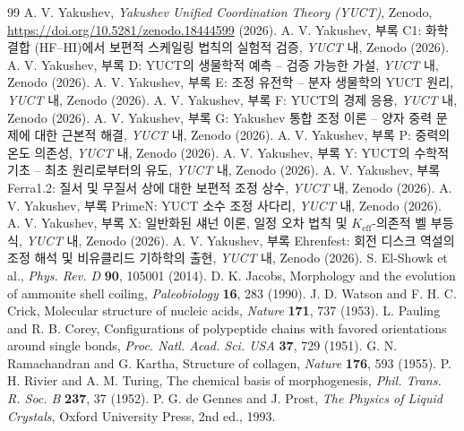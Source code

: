 \documentclass[11pt,a4paper]{article}
\begin{document}
	\begin{thebibliography}{99}
		A. V. Yakushev, \emph{Yakushev Unified Coordination Theory (YUCT)}, Zenodo, \url{https://doi.org/10.5281/zenodo.18444599} (2026).
		A. V. Yakushev, 부록 C1: 화학 결합 (HF–HI)에서 보편적 스케일링 법칙의 실험적 검증, \emph{YUCT} 내, Zenodo (2026).
		A. V. Yakushev, 부록 D: YUCT의 생물학적 예측 – 검증 가능한 가설, \emph{YUCT} 내, Zenodo (2026).
		A. V. Yakushev, 부록 E: 조정 유전학 – 분자 생물학의 YUCT 원리, \emph{YUCT} 내, Zenodo (2026).
		A. V. Yakushev, 부록 F: YUCT의 경제 응용, \emph{YUCT} 내, Zenodo (2026).
		A. V. Yakushev, 부록 G: Yakushev 통합 조정 이론 – 양자 중력 문제에 대한 근본적 해결, \emph{YUCT} 내, Zenodo (2026).
		A. V. Yakushev, 부록 P: 중력의 온도 의존성, \emph{YUCT} 내, Zenodo (2026).
		A. V. Yakushev, 부록 Y: YUCT의 수학적 기초 – 최초 원리로부터의 유도, \emph{YUCT} 내, Zenodo (2026).
		A. V. Yakushev, 부록 Ferra1.2: 질서 및 무질서 상에 대한 보편적 조정 상수, \emph{YUCT} 내, Zenodo (2026).
		A. V. Yakushev, 부록 PrimeN: YUCT 소수 조정 사다리, \emph{YUCT} 내, Zenodo (2026).
		A. V. Yakushev, 부록 X: 일반화된 섀넌 이론, 일정 오차 법칙 및 \(K_{\mathrm{eff}}\)-의존적 벨 부등식, \emph{YUCT} 내, Zenodo (2026).
		A. V. Yakushev, 부록 Ehrenfest: 회전 디스크 역설의 조정 해석 및 비유클리드 기하학의 출현, \emph{YUCT} 내, Zenodo (2026).
		S. El-Showk et al., \emph{Phys. Rev. D} \textbf{90}, 105001 (2014).
		D. K. Jacobs, Morphology and the evolution of ammonite shell coiling, \emph{Paleobiology} \textbf{16}, 283 (1990).
		J. D. Watson and F. H. C. Crick, Molecular structure of nucleic acids, \emph{Nature} \textbf{171}, 737 (1953).
		L. Pauling and R. B. Corey, Configurations of polypeptide chains with favored orientations around single bonds, \emph{Proc. Natl. Acad. Sci. USA} \textbf{37}, 729 (1951).
		G. N. Ramachandran and G. Kartha, Structure of collagen, \emph{Nature} \textbf{176}, 593 (1955).
		P. H. Rivier and A. M. Turing, The chemical basis of morphogenesis, \emph{Phil. Trans. R. Soc. B} \textbf{237}, 37 (1952).
		P. G. de Gennes and J. Prost, \emph{The Physics of Liquid Crystals}, Oxford University Press, 2nd ed., 1993.

\end{thebibliography}
\end{document}
